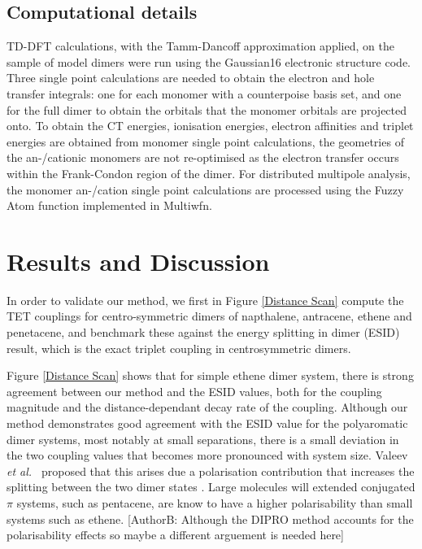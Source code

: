 \documentclass[aps,physrev,reprint,superscriptaddress,nofootinbib,amsmath,amssymb,a4paper]{revtex4-2}
\newcommand{\tom}[1]{\textcolor{orange!80!black}{[AuthorB: #1]}}
\begin{document}
\subsection{Computational details}
TD-DFT calculations, with the Tamm-Dancoff approximation applied, on the sample of model dimers were run using the Gaussian16\cite{g16} electronic structure code. Three single point calculations are needed to obtain the electron and hole transfer integrals: one for each monomer with a counterpoise basis set, and one for the full dimer to obtain the orbitals that the monomer orbitals are projected onto. To obtain the CT energies, ionisation energies, electron affinities and triplet energies are obtained from monomer single point calculations, the geometries of the an-/cationic monomers are not re-optimised as the electron transfer occurs within the Frank-Condon region of the dimer. For distributed multipole analysis, the monomer an-/cation single point calculations are processed using the Fuzzy Atom function\cite{Pends2006} implemented in Multiwfn\cite{Lu2011}. 

\section{Results and Discussion}


In order to validate our method, we first in Figure \ref{Distance Scan} compute the TET couplings for centro-symmetric dimers of napthalene, antracene, ethene and penetacene, and benchmark these against the energy splitting in dimer (ESID) result, which is the exact triplet coupling in centrosymmetric dimers. 



Figure \ref{Distance Scan} shows that for simple ethene dimer system, there is strong agreement between our method and the ESID values, both for the coupling magnitude and the distance-dependant decay rate of the coupling. Although our method demonstrates good agreement with the ESID value for the polyaromatic dimer systems, most notably at small separations, there is a small deviation in the two coupling values that becomes more pronounced with system size. Valeev \textit{et al.\ } proposed that this arises due a polarisation contribution that increases the splitting between the two dimer states \cite{Valeev2006}. Large molecules will extended conjugated $\pi$ systems, such as pentacene, are know to have a higher polarisability than small systems such as ethene. \tom{Although the DIPRO method accounts for the polarisability effects so maybe a different arguement is needed here} 
\end{document}
